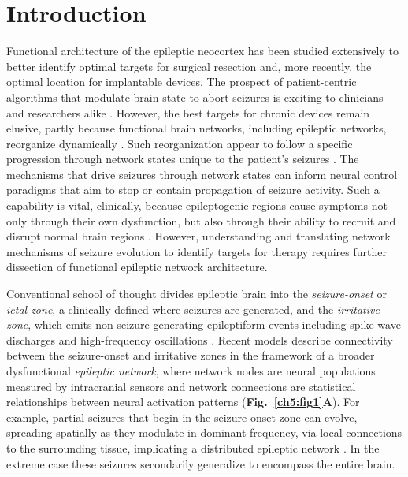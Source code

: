 \section{Introduction}
Functional architecture of the epileptic neocortex has been studied extensively to better identify optimal targets for surgical resection and, more recently, the optimal location for implantable devices. The prospect of patient-centric algorithms that modulate brain state to abort seizures is exciting to clinicians and researchers alike \cite{morrell2011responsive, stanslaski2012design, afshar2013translational}. However, the best targets for chronic devices remain elusive, partly because functional brain networks, including epileptic networks, reorganize dynamically \cite{bassett2006adaptive, bassett2011dynamic, rummel2013systems-level, burns2014network}. Such reorganization appear to follow a specific progression through network states unique to the patient's seizures \cite{wulsin2013parsing, burns2014network}. The mechanisms that drive seizures through network states can inform neural control paradigms that aim to stop or contain propagation of seizure activity. Such a capability is vital, clinically, because epileptogenic regions cause symptoms not only through their own dysfunction, but also through their ability to recruit and disrupt normal brain regions \cite{kutsy1999ictal}. However, understanding and translating network mechanisms of seizure evolution to identify targets for therapy requires further dissection of functional epileptic network architecture. 

Conventional school of thought divides epileptic brain into the \textit{seizure-onset} or \textit{ictal zone}, a clinically-defined where seizures are generated, and the \textit{irritative zone}, which emits non-seizure-generating epileptiform events including spike-wave discharges and high-frequency oscillations \cite{rosenow2001presurgical}. Recent models describe connectivity between the seizure-onset and irritative zones in the framework of a broader dysfunctional \textit{epileptic network}, where network nodes are neural populations measured by intracranial sensors and network connections are statistical relationships between neural activation patterns \cite{nair2004critical, kramer2010coalescence, warren2010synchrony, wilke2011graph, burns2014network} (\textbf{Fig.~\ref{ch5:fig1}A}). For example, partial seizures that begin in the seizure-onset zone can evolve, spreading spatially as they modulate in dominant frequency, via local connections to the surrounding tissue, implicating a distributed epileptic network \cite{spencer2002neural, nair2004critical, kramer2010coalescence, korzeniewska2014ictal}. In the extreme case these seizures secondarily generalize to encompass the entire brain.

